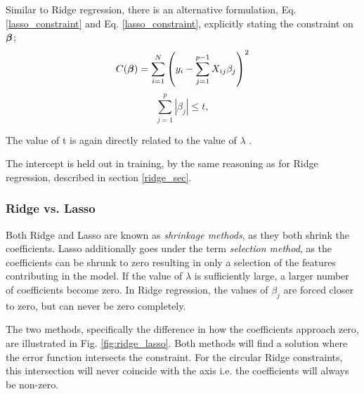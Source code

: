 Similar to Ridge regression, there is an alternative formulation, Eq. \ref{lasso_constraint} and Eq. \ref{lasso_constraint}, explicitly stating the constraint on $\boldsymbol{\beta}$;
\begin{equation}\label{lasso_alt}
    C(\boldsymbol{\beta}) = \sum_{i=1}^N \left(y_i - \sum_{j=1}^{p-1} X_{ij}\beta_j \right)^2
\end{equation}
\begin{equation}\label{lasso_constraint}
    \sum_{j=1}^p | \beta_j | \leq t, 
\end{equation}


The value of t is again directly related to the value of $\lambda$ \citep[p. 68]{hastie}.


The intercept is held out in training, by the same reasoning as for Ridge regression, described in section \ref{ridge_sec}.


\subsubsection{Ridge vs. Lasso}
Both Ridge and Lasso are known as \textit{shrinkage methods}, as they both shrink the coefficients. Lasso additionally goes under the term \textit{selection method}, as the coefficients can be shrunk to zero resulting in only a selection of the features contributing in the model. 
If the value of $\lambda$ is sufficiently large, a larger number of coefficients become zero. 
In Ridge regression, the values of $\beta_j$ are forced closer to zero, but can never be zero completely. 

The two methods, specifically the difference in how the coefficients approach zero, are illustrated in Fig. \ref{fig:ridge_lasso}. Both methods will find a solution where the error function intersects the constraint. For the circular Ridge constraints, this intersection will never coincide with the axis i.e. the coefficients will always be non-zero. 

